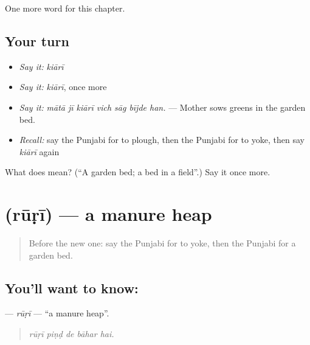 \begin{grammarlens}[title={What you've built}]
One more word for this chapter.
\end{grammarlens}

\subsection*{Your turn}
\begin{itemize}
\raggedright
  \item \emph{Say it:} \emph{kiārī}
  \item \emph{Say it:} \emph{kiārī}, once more
  \item \emph{Say it:} \emph{mātā jī kiārī vich sāg bījde han.} — Mother sows greens in the garden bed.
  \item \emph{Recall:} say the Punjabi for to plough, then the Punjabi for to yoke, then say \emph{kiārī} again
\end{itemize}

\begin{tcolorbox}[breakable,colback=teal!4,colframe=teal!35!black,title={Before you move on}]
What does  mean? (\textquotedblleft{}A garden bed; a bed in a field\textquotedblright{}.) Say it once more.
\end{tcolorbox}
\section[\texorpdfstring{\pa{ਰੂੜੀ} (rūṛī)}{ਰੂੜੀ (rūṛī)}]{ (rūṛī) — a manure heap}

\label{lesson:PA-C302-ruri}



\begin{quote}
Before the new one: say the Punjabi for to yoke, then the Punjabi for a garden bed.
\end{quote}

\subsection*{You'll want to know: }
\textbf{} — \emph{rūṛī} — \textquotedblleft{}a manure heap\textquotedblright{}.

\begin{quote}
    
\end{quote}

\begin{quote}
\emph{rūṛī piṇḍ de bāhar hai.}
\end{quote}

